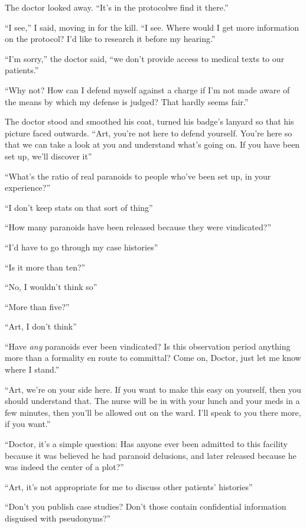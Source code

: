 The doctor looked away. “It’s in the protocol{\dash}we find it there.”

“I see,” I said, moving in for the kill. “I see. Where would I get
more information on the protocol? I’d like to research it before my
hearing.”

“I’m sorry,” the doctor said, “we don’t provide access to medical
texts to our patients.”

“Why not? How can I defend myself against a charge if I’m not made
aware of the means by which my defense is judged? That hardly seems
fair.”

The doctor stood and smoothed his coat, turned his badge’s lanyard
so that his picture faced outwards. “Art, you’re not here to defend
yourself. You’re here so that we can take a look at you and
understand what’s going on. If you have been set up, we’ll discover
it{\dash}”

“What’s the ratio of real paranoids to people who’ve been set up,
in your experience?”

“I don’t keep stats on that sort of thing{\dash}”

“How many paranoids have been released because they were
vindicated?”

“I’d have to go through my case histories{\dash}”

“Is it more than ten?”

“No, I wouldn’t think so{\dash}”

“More than five?”

“Art, I don’t think{\dash}”

“Have \emph{any} paranoids ever been vindicated? Is this
observation period anything more than a formality en route to
committal? Come on, Doctor, just let me know where I stand.”

“Art, we’re on your side here. If you want to make this easy on
yourself, then you should understand that. The nurse will be in
with your lunch and your meds in a few minutes, then you’ll be
allowed out on the ward. I’ll speak to you there more, if you
want.”

“Doctor, it’s a simple question: Has anyone ever been admitted to
this facility because it was believed he had paranoid delusions,
and later released because he was indeed the center of a plot?”

“Art, it’s not appropriate for me to discuss other patients’
histories{\dash}”

“Don’t you publish case studies? Don’t those contain confidential
information disguised with pseudonyms?”

